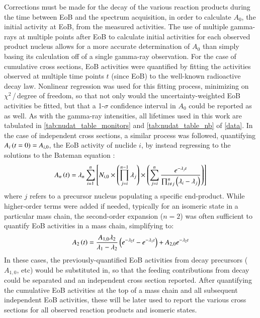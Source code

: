 Corrections must be made for the decay of the various reaction products during the time between EoB and the spectrum acquisition, in order to calculate $A_0$, the initial activity at EoB, from the measured activities.
The use of  multiple gamma-rays at multiple points after EoB to calculate initial activities  for each observed product nucleus allows for a more accurate  determination of $A_0$ than simply basing its calculation off of a single gamma-ray observation.
For the case of cumulative cross sections, EoB activities were quantified by fitting the activities observed at multiple time points $t$ (since EoB) to the well-known radioactive decay law.
Nonlinear regression was used for this fitting process, minimizing on $\chi^2$\,/\,degree of freedom, so that not only would the uncertainty-weighted EoB activities be fitted, but that a 1-$\sigma$ confidence interval in $A_0$ could be reported as as well.
As with the gamma-ray intensities, all lifetimes used in this work are tabulated in \autoref{tab:nudat_table_monitors} and \autoref{tab:nudat_table_nb} of \ref{data}.
In the case of independent cross sections, a similar process was followed, quantifying $A_i\left( t=0\right) = A_{i,0}$, the EoB activity of nuclide $i$, by instead regressing to the solutions to the Bateman equation \cite{bateman1910solution,Cetnar2006}:
\begin{equation}
A_n\left( t\right) = \lambda_n \sum_{i=1}^n \left[  N_{i,0} \times \left( \prod_{j=i}^{n-1}\lambda_j\right) \times \left( \sum_{j=i}^n \dfrac{e^{-\lambda_j t}}{\prod_{i\neq j}^n \left( \lambda_i - \lambda_j\right)}  \right)   \right]
\end{equation}
where $j$ refers to a precursor nucleus populating a specific end-product.  
While higher-order terms were added if needed, typically for an isomeric state in a particular mass chain,  the second-order expansion ($n=2$) was often sufficient to quantify EoB activities in a mass chain, simplifying to:
\begin{equation}
A_2\left( t\right) = \dfrac{A_{1,0}\lambda_2}{\lambda_1 - \lambda_2} \left( e^{-\lambda_2 t} - e^{-\lambda_1 t}\right) + A_{2,0} e^{-\lambda_2 t}
\end{equation}
In these cases, the previously-quantified EoB activities from decay precursors ($A_{1,0}$, etc) would be substituted in, so that the feeding contributions from decay could be separated and an independent cross section reported.
After quantifying the cumulative EoB activities at the top of a mass chain and all subsequent independent EoB activities, these will be later used to report the various cross sections for all observed reaction products and isomeric states. 











